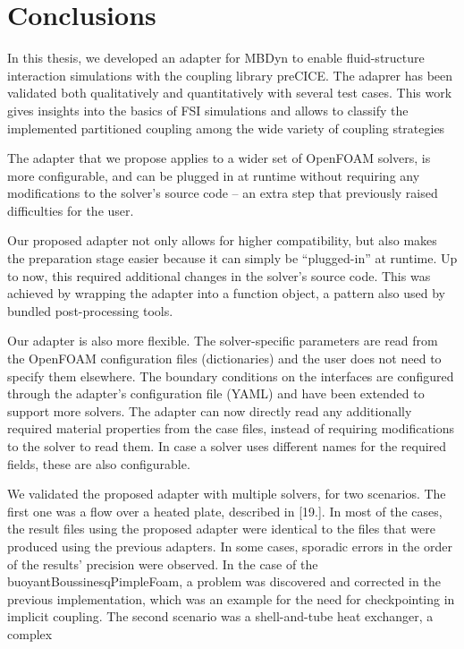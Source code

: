 \chapter{Conclusions}
\label{cha:conclusions}

In this thesis, we  developed an adapter for MBDyn to enable fluid-structure interaction simulations with the coupling library preCICE.
The adaprer has been validated both qualitatively and quantitatively with several test cases.
This work gives insights into the basics of FSI simulations and allows to classify the implemented partitioned
coupling among the wide variety of coupling strategies

The adapter that we propose applies to a wider set of OpenFOAM solvers, is more
configurable, and can be plugged in at runtime without requiring any modifications to the
solver’s source code – an extra step that previously raised difficulties for the user.


Our proposed adapter not only allows for higher compatibility, but also makes the preparation
stage easier because it can simply be “plugged-in” at runtime. Up to now, this
required additional changes in the solver’s source code. This was achieved by wrapping the
adapter into a function object, a pattern also used by bundled post-processing tools.

Our adapter is also more flexible. The solver-specific parameters are read from the
OpenFOAM configuration files (dictionaries) and the user does not need to specify them
elsewhere. The boundary conditions on the interfaces are configured through the adapter’s
configuration file (YAML) and have been extended to support more solvers. The adapter
can now directly read any additionally required material properties from the case files,
instead of requiring modifications to the solver to read them. In case a solver uses different
names for the required fields, these are also configurable.

We validated the proposed adapter with multiple solvers, for two scenarios. The first
one was a flow over a heated plate, described in [19.]. In most of the cases, the result files
using the proposed adapter were identical to the files that were produced using the previous
adapters. In some cases, sporadic errors in the order of the results’ precision were observed.
In the case of the buoyantBoussinesqPimpleFoam, a problem was discovered and corrected
in the previous implementation, which was an example for the need for checkpointing in
implicit coupling. The second scenario was a shell-and-tube heat exchanger, a complex

